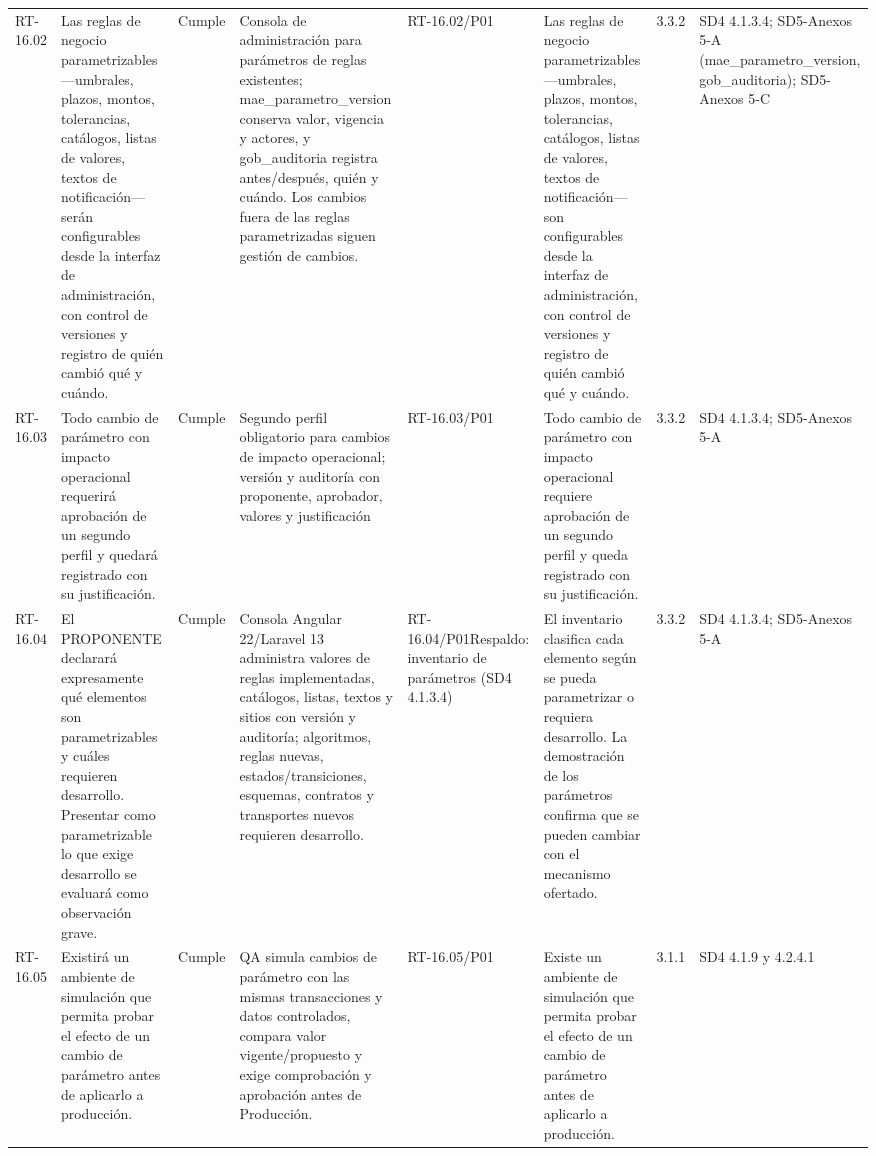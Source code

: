 \documentclass[oficio,firma,final]{lafrox}
\begin{document}
\begin{landscape}
{\begin{longtable}{@{}F{0.054} F{0.173} F{0.061} F{0.191} F{0.106} F{0.180} F{0.067} F{0.168}@{}}
  RT-16.02 & Las reglas de negocio parametrizables —umbrales, plazos, montos, tolerancias, catálogos, listas de valores, textos de notificación— serán configurables desde la interfaz de administración, con control de versiones y registro de quién cambió qué y cuándo. & Cumple & Consola de administración para parámetros de reglas existentes; mae\_parametro\_version conserva valor, vigencia y actores, y gob\_auditoria registra antes/después, quién y cuándo. Los cambios fuera de las reglas parametrizadas siguen gestión de cambios. & RT-16.02/\allowbreak{}P01 & Las reglas de negocio parametrizables —umbrales, plazos, montos, tolerancias, catálogos, listas de valores, textos de notificación— son configurables desde la interfaz de administración, con control de versiones y registro de quién cambió qué y cuándo. & 3.3.2 & SD4 4.1.3.4; SD5-Anexos 5-A (mae\_parametro\_version, gob\_auditoria); SD5-Anexos 5-C  \\
  RT-16.03 & Todo cambio de parámetro con impacto operacional requerirá aprobación de un segundo perfil y quedará registrado con su justificación. & Cumple & Segundo perfil obligatorio para cambios de impacto operacional; versión y auditoría con proponente, aprobador, valores y justificación & RT-16.03/\allowbreak{}P01 & Todo cambio de parámetro con impacto operacional requiere aprobación de un segundo perfil y queda registrado con su justificación. & 3.3.2 & SD4 4.1.3.4; SD5-Anexos 5-A  \\
  RT-16.04 & El PROPONENTE declarará expresamente qué elementos son parametrizables y cuáles requieren desarrollo. Presentar como parametrizable lo que exige desarrollo se evaluará como observación grave. & Cumple & Consola Angular 22/Laravel 13 administra valores de reglas implementadas, catálogos, listas, textos y sitios con versión y auditoría; algoritmos, reglas nuevas, estados/transiciones, esquemas, contratos y transportes nuevos requieren desarrollo. & RT-16.04/\allowbreak{}P01\newline Respaldo: inventario de parámetros (SD4 4.1.3.4) & El inventario clasifica cada elemento según se pueda parametrizar o requiera desarrollo. La demostración de los parámetros confirma que se pueden cambiar con el mecanismo ofertado. & 3.3.2 & SD4 4.1.3.4; SD5-Anexos 5-A  \\
  RT-16.05 & Existirá un ambiente de simulación que permita probar el efecto de un cambio de parámetro antes de aplicarlo a producción. & Cumple & QA simula cambios de parámetro con las mismas transacciones y datos controlados, compara valor vigente/propuesto y exige comprobación y aprobación antes de Producción. & RT-16.05/\allowbreak{}P01 & Existe un ambiente de simulación que permita probar el efecto de un cambio de parámetro antes de aplicarlo a producción. & 3.1.1 & SD4 4.1.9 y 4.2.4.1  \\

\end{longtable}}
\end{landscape}
\end{document}
